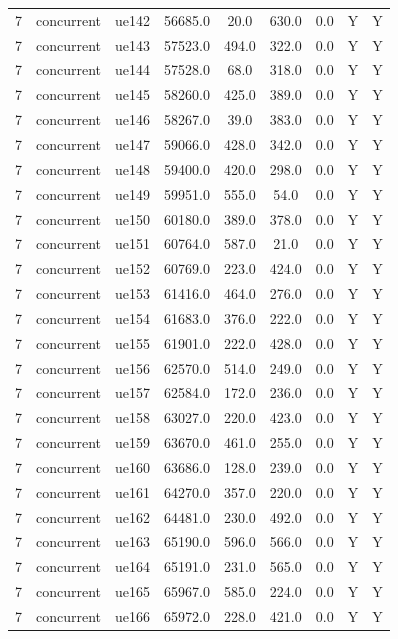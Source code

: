 \begin{table}[ht]
\begin{tabular}{|c|c|c|c|c|c|c|c|c|}
7 & concurrent & ue142 & 56685.0 & 20.0 & 630.0 & 0.0 & Y & Y \\
7 & concurrent & ue143 & 57523.0 & 494.0 & 322.0 & 0.0 & Y & Y \\
7 & concurrent & ue144 & 57528.0 & 68.0 & 318.0 & 0.0 & Y & Y \\
7 & concurrent & ue145 & 58260.0 & 425.0 & 389.0 & 0.0 & Y & Y \\
7 & concurrent & ue146 & 58267.0 & 39.0 & 383.0 & 0.0 & Y & Y \\
7 & concurrent & ue147 & 59066.0 & 428.0 & 342.0 & 0.0 & Y & Y \\
7 & concurrent & ue148 & 59400.0 & 420.0 & 298.0 & 0.0 & Y & Y \\
7 & concurrent & ue149 & 59951.0 & 555.0 & 54.0 & 0.0 & Y & Y \\
7 & concurrent & ue150 & 60180.0 & 389.0 & 378.0 & 0.0 & Y & Y \\
7 & concurrent & ue151 & 60764.0 & 587.0 & 21.0 & 0.0 & Y & Y \\
7 & concurrent & ue152 & 60769.0 & 223.0 & 424.0 & 0.0 & Y & Y \\
7 & concurrent & ue153 & 61416.0 & 464.0 & 276.0 & 0.0 & Y & Y \\
7 & concurrent & ue154 & 61683.0 & 376.0 & 222.0 & 0.0 & Y & Y \\
7 & concurrent & ue155 & 61901.0 & 222.0 & 428.0 & 0.0 & Y & Y \\
7 & concurrent & ue156 & 62570.0 & 514.0 & 249.0 & 0.0 & Y & Y \\
7 & concurrent & ue157 & 62584.0 & 172.0 & 236.0 & 0.0 & Y & Y \\
7 & concurrent & ue158 & 63027.0 & 220.0 & 423.0 & 0.0 & Y & Y \\
7 & concurrent & ue159 & 63670.0 & 461.0 & 255.0 & 0.0 & Y & Y \\
7 & concurrent & ue160 & 63686.0 & 128.0 & 239.0 & 0.0 & Y & Y \\
7 & concurrent & ue161 & 64270.0 & 357.0 & 220.0 & 0.0 & Y & Y \\
7 & concurrent & ue162 & 64481.0 & 230.0 & 492.0 & 0.0 & Y & Y \\
7 & concurrent & ue163 & 65190.0 & 596.0 & 566.0 & 0.0 & Y & Y \\
7 & concurrent & ue164 & 65191.0 & 231.0 & 565.0 & 0.0 & Y & Y \\
7 & concurrent & ue165 & 65967.0 & 585.0 & 224.0 & 0.0 & Y & Y \\
7 & concurrent & ue166 & 65972.0 & 228.0 & 421.0 & 0.0 & Y & Y \\

\end{tabular}
\end{table}

